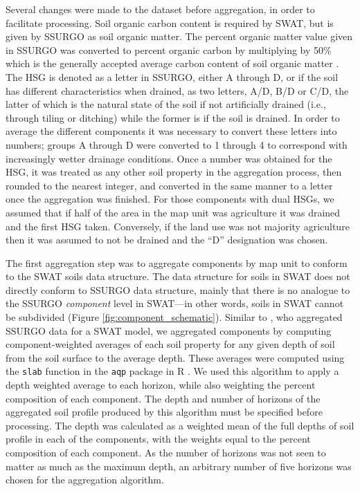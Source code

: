 Several changes were made to the dataset before aggregation, in order to
facilitate processing. Soil organic carbon content is required by SWAT, but is
given by SSURGO as soil organic matter. The percent organic matter value given in SSURGO
was converted to percent organic carbon by multiplying by 50\% which is the generally accepted average carbon content of soil organic matter \citep{brady_elements_2004}. The HSG is
denoted as a letter in SSURGO, either A through D, or if the soil has different
characteristics when drained, as two letters, A/D, B/D or C/D, the latter of
which is the natural state of the soil if not artificially drained (i.e.,
through tiling or ditching) while the former is if the soil is drained.
In order to average the different components it was necessary to convert these letters
into numbers; groups A through D were converted to 1 through 4 to correspond
with increasingly wetter drainage conditions. Once a number was obtained for the
HSG, it was treated as any other soil property in the aggregation process,
then rounded to the nearest integer, and converted in the same manner to a letter
once the aggregation was finished. For those components with dual HSGs, we
assumed that if half of the area in the map unit was agriculture it was drained
and the first HSG taken. Conversely, if the land use was not majority agriculture
then it was assumed to not be drained and the ``D'' designation was chosen.

The first aggregation step was to aggregate components by map unit to conform to
the SWAT soils data structure. The data structure for soils in SWAT does not
directly conform to SSURGO data structure, mainly that there is no analogue to the
SSURGO \textit{component} level in SWAT---in other words, soils in SWAT cannot
be subdivided (Figure \ref{fig:component_schematic}). 
Similar to \citet{gatzke_aggregation_2011}, who aggregated SSURGO data for a SWAT model, 
we aggregated components by computing
component-weighted averages of each soil property for any given depth of soil from the soil surface to the average depth.
These averages were computed using the \texttt{slab} function in the \texttt{aqp} package in R \citep{beaudette_algorithms_2013}. We
used this algorithm to apply a depth weighted average to each horizon, while
also weighting the percent composition of each component. The depth and number of horizons of
the aggregated soil profile produced by this algorithm must be specified before
processing. The depth was calculated as a weighted mean of the full depths of
soil profile in each of the components, with the weights equal to the percent composition of each
component. As the number of horizons was not seen to matter as much as the
maximum depth, an arbitrary number of five horizons was chosen for the
aggregation algorithm.

